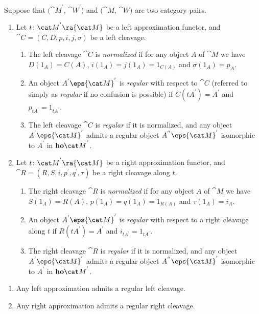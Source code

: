 \begin{defn}
\label{defn:wregularcleavageobj}
Suppose that $({\cat M}^{'}$, ${\cat W}^{'})$ and $({\cat M}$, ${\cat W})$ are two category pairs.
\begin{enumerate}
\item
Let $t \colon {\cat M}^{'} \ra {\cat M}$ be a left approximation functor, and ${\cat C} = (C, D, p, i, j, \sigma)$ be a left cleavage. 
\begin{enumerate}
\item
The left cleavage ${\cat C}$ is {\it normalized} if for any object $A$ of ${\cat M}$ we have $D(1_A) = C(A)$, $i(1_A) = j(1_A) = 1_{C(A)}$ and $\sigma(1_A) = p_A$.
\item
An object $A^{'} \eps {\cat M}^{'}$ is {\it regular} with respect to ${\cat C}$ (referred to simply as {\it regular} if no confusion is possible) if $C(tA^{'}) = A^{'}$ and $p_{tA^{'}} = 1_{tA^{'}}$.
\item
The left cleavage ${\cat C}$ is {\it regular} if it is normalized, and any object $A^{'} \eps {\cat M}^{'}$ admits a regular object $A^{''} \eps {\cat M}^{'}$ isomorphic to $A^{'}$ in ${\bf ho}{\cat M}^{'}$.
\end{enumerate}
\item
Let $t \colon {\cat M}^{'} \ra {\cat M}$ be a right approximation functor, and ${\cat R} = (R, S, i, p^{'}, q^{'}, \tau)$ be a right cleavage along $t$. 
\begin{enumerate}
\item
The right cleavage ${\cat R}$ is {\it normalized} if for any object $A$ of ${\cat M}$ we have $S(1_A) = R(A)$, $p(1_A) = q(1_A) = 1_{R(A)}$ and $\tau(1_A) = i_A$.
\item
An object $A^{'} \eps {\cat M}^{'}$ is {\it regular} with respect to a right cleavage along $t$ if $R(tA^{'}) = A^{'}$ and $i_{tA^{'}} = 1_{tA^{'}}$.
\item
The right cleavage ${\cat R}$ is {\it regular} if it is normalized, and any object $A^{'} \eps {\cat M}^{'}$ admits a regular object $A^{''} \eps {\cat M}^{'}$ isomorphic to $A^{'}$ in ${\bf ho}{\cat M}^{'}$.
\end{enumerate}
\end{enumerate}
\end{defn}

\begin{lem}
\label{lem:admitframing}
\mbox{}
\begin{enumerate}
\item
Any left approximation admits a regular left cleavage.
\item
Any right approximation admits a regular right cleavage. 
\end{enumerate}
\end{lem}

